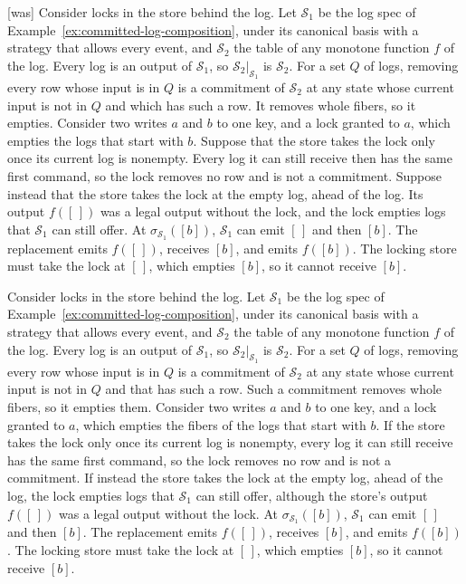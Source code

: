 \documentclass[sigconf]{cidr-2027}
\theoremstyle{remark}
\newcommand{\commitment}{commitment\xspace}
\newcommand{\Spec}{\mathcal{S}}
\begin{document}
{\footnotesize\color{black!50}\noindent\textsf{[was]} Consider locks in the store behind the log.  Let $\Spec_1$ be the log
spec of Example~\ref{ex:committed-log-composition}, under its
canonical basis with a strategy that allows every event, and $\Spec_2$ the
table of any monotone function $f$ of the log.  Every log is an output of
$\Spec_1$, so $\Spec_2|_{\Spec_1}$ is $\Spec_2$.  For a set $Q$ of logs,
removing every row whose input is in $Q$ is a \commitment of $\Spec_2$ at any
state whose current input is not in $Q$ and which has such a row.  It removes
whole fibers, so it empties.  Consider two writes $a$ and $b$ to one key, and a
lock granted to $a$, which empties the logs that start with $b$.  Suppose that
the store takes the lock only once its current log is nonempty.  Every log it
can still receive then has the same first command, so the lock removes no row
and is not a \commitment.  Suppose instead that the store takes the lock at the
empty log, ahead of the log.  Its output $f([\,])$ was a legal output without the
lock, and the lock empties logs that $\Spec_1$ can still offer.  At
$\sigma_{\Spec_1}([b])$, $\Spec_1$ can emit $[\,]$ and then $[b]$.  The
replacement emits $f([\,])$, receives $[b]$, and emits $f([b])$.  The locking
store must take the lock at $[\,]$, which empties $[b]$, so it cannot receive
$[b]$.\par}

\color{blue!70!black}Consider locks in the store behind the log.  Let $\Spec_1$ be the log
spec of Example~\ref{ex:committed-log-composition}, under its
canonical basis with a strategy that allows every event, and $\Spec_2$ the
table of any monotone function $f$ of the log.  Every log is an output of
$\Spec_1$, so $\Spec_2|_{\Spec_1}$ is $\Spec_2$.  For a set $Q$ of logs,
removing every row whose input is in $Q$ is a \commitment of $\Spec_2$ at any
state whose current input is not in $Q$ and that has such a row.  Such a
\commitment removes whole fibers, so it empties them.  Consider two writes $a$
and $b$ to one key, and a lock granted to $a$, which empties the fibers of the
logs that start with $b$.  If the store takes the lock only once its current
log is nonempty, every log it can still receive has the same first command, so
the lock removes no row and is not a \commitment.  If instead the store takes
the lock at the empty log, ahead of the log, the lock empties logs that
$\Spec_1$ can still offer, although the store's output $f([\,])$ was a legal
output without the lock.  At
$\sigma_{\Spec_1}([b])$, $\Spec_1$ can emit $[\,]$ and then $[b]$.  The
replacement emits $f([\,])$, receives $[b]$, and emits $f([b])$.  The locking
store must take the lock at $[\,]$, which empties $[b]$, so it cannot receive
$[b]$.\color{black}
\end{document}
